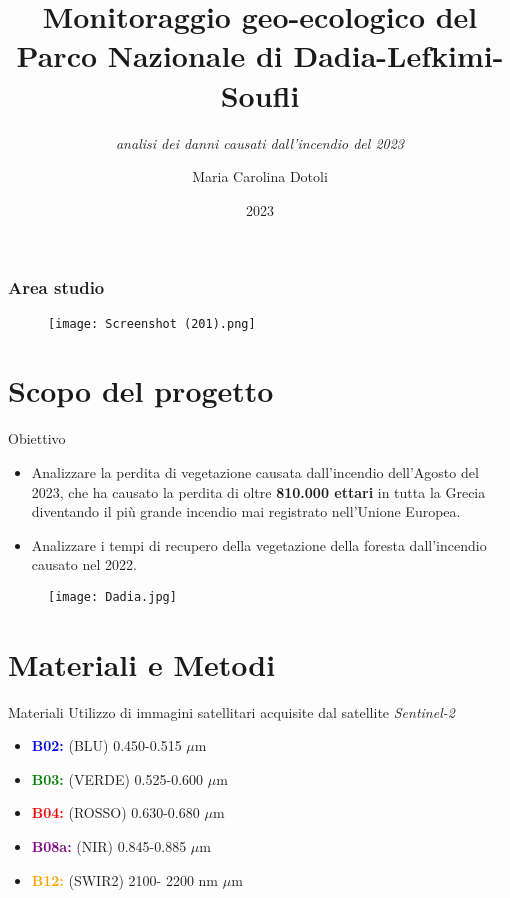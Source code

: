 \documentclass{beamer}
\title{Monitoraggio geo-ecologico del Parco Nazionale di Dadia-Lefkimi-Soufli}
\subtitle{\textit{analisi dei danni causati dall'incendio del 2023}}
\author{Maria Carolina Dotoli}
\institute{Alma Mater Studiorum - Università di Bologna}
\date{2023}
\begin{document}
\maketitle



\begin{frame}
\frametitle{\textbf{Area studio}}
\begin{figure}
    \centering
    \texttt{[image: Screenshot (201).png]}
\end{figure}
 \end{frame}
 \section{Scopo del progetto}

\begin{frame}{Obiettivo}
\begin{itemize}[label=$\bullet$]
    \item  Analizzare la perdita di vegetazione causata dall'incendio dell'Agosto del 2023, che ha causato la perdita di oltre \textbf{810.000 ettari} in tutta la Grecia diventando il più grande incendio mai registrato nell'Unione Europea. 
    \item Analizzare i tempi di recupero della vegetazione della foresta dall'incendio causato nel 2022. 
\end{itemize}
    \begin{figure}
        \centering
        \texttt{[image: Dadia.jpg]}
    \end{figure}
\end{frame}

\section{Materiali e Metodi}

\begin{frame}{Materiali}
Utilizzo di immagini satellitari acquisite dal satellite \textit{Sentinel-2}
\begin{itemize}[topsep=22pt]
    \item \textbf{\textcolor{blue}{B02:}} (BLU) 0.450-0.515 $\mu$m\
    \item \textbf{\textcolor{green}{B03:}} (VERDE) 0.525-0.600 $\mu$m\
    \item \textbf{\textcolor{red}{B04:}} (ROSSO) 0.630-0.680 $\mu$m\
    \item \textbf{\textcolor{purple}{B08a:}} (NIR) 0.845-0.885 $\mu$m\
    \item \textbf{\textcolor{orange}{B12:}} (SWIR2) 2100- 2200 nm $\mu$m\
\end{itemize}
\end{frame}
\end{document}
